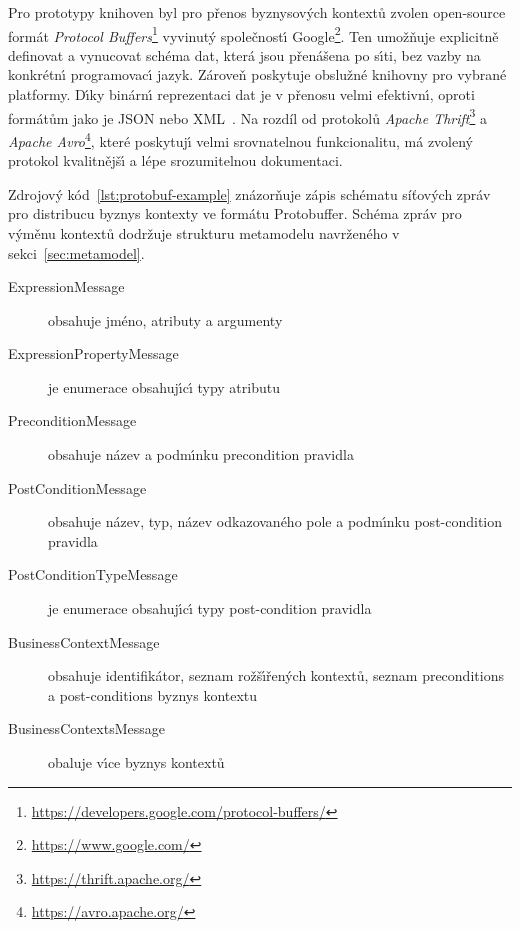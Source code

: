 Pro prototypy knihoven byl pro přenos byznysových kontextů zvolen open-source formát
\textit{Protocol Buffers}\footnote{\url{https://developers.google.com/protocol-buffers/}}\cite{varda2008protocol}
vyvinut\'y společnost\'{\i} Google\footnote{\url{https://www.google.com/}}.
Ten umožňuje explicitně definovat a vynucovat schéma dat,
která jsou přenášena po s\'{\i}ti, bez vazby na konkrétn\'{\i} programovac\'{\i}
jazyk. Zároveň poskytuje obslužné knihovny pro vybrané platformy.
D\'{\i}ky binárn\'{\i} reprezentaci dat je v přenosu velmi efektivn\'{\i},
oproti formátům jako je \gls{JSON} nebo \gls{XML}~\cite{maeda2012performance}.
Na rozdíl od protokolů \textit{Apache Thrift}\footnote{\url{https://thrift.apache.org/}}
a \textit{Apache Avro}\footnote{\url{https://avro.apache.org/}}, které poskytuj\'{\i}
velmi srovnatelnou funkcionalitu, má zvolený protokol kvalitnějš\'{\i} a lépe
srozumitelnou dokumentaci.



Zdrojov\'y kód~\ref{lst:protobuf-example} znázorňuje zápis schématu
síťových zpráv pro distribucu byznys kontexty ve formátu Protobuffer.
Schéma zpráv pro v\'yměnu kontextů dodržuje strukturu metamodelu navrženého
v sekci~\ref{sec:metamodel}.

\begin{description}
    \item [ExpressionMessage] obsahuje jméno, atributy a argumenty 
    \item [ExpressionPropertyMessage] je enumerace obsahuj\'{\i}c\'{\i} typy atributu 
    \item [PreconditionMessage] obsahuje název a podm\'{\i}nku precondition pravidla
    \item [PostConditionMessage] obsahuje název, typ, název odkazovaného pole a podm\'{\i}nku post-condition pravidla
    \item [PostConditionTypeMessage] je enumerace obsahuj\'{\i}c\'{\i} typy post-condition pravidla
    \item [BusinessContextMessage] obsahuje identifikátor, seznam rožš\'{\i}řen\'ych kontextů, seznam preconditions a post-conditions byznys kontextu
    \item [BusinessContextsMessage] obaluje v\'{\i}ce byznys kontextů
\end{description}

